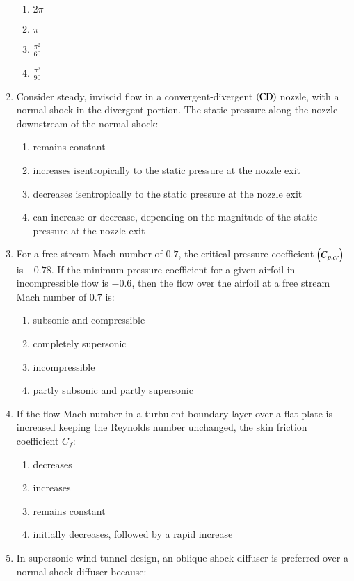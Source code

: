 \documentclass[journal]{IEEEtran}
\begin{document}
\begin{enumerate}[start=35]
\begin{enumerate}
    \item $2\pi$
    \item $\pi$
    \item $\frac{\pi^2}{60}$
    \item $\frac{\pi^2}{90}$
\end{enumerate}
\item Consider steady, inviscid flow in a convergent-divergent $\left(\text{CD}\right)$ nozzle, with a normal shock in the divergent portion. The static pressure along the nozzle downstream of the normal shock:
\begin{enumerate}
    \item remains constant
    \item increases isentropically to the static pressure at the nozzle exit
    \item decreases isentropically to the static pressure at the nozzle exit
    \item can increase or decrease, depending on the magnitude of the static pressure at the nozzle exit
\end{enumerate}
\item For a free stream Mach number of $0.7$, the critical pressure coefficient $\left(C_{p,cr}\right)$ is $-0.78$. If the minimum pressure coefficient for a given airfoil in incompressible flow is $-0.6$, then the flow over the airfoil at a free stream Mach number of $0.7$ is:
\begin{enumerate}
    \item subsonic and compressible
    \item completely supersonic
    \item incompressible
    \item partly subsonic and partly supersonic
\end{enumerate}
\item If the flow Mach number in a turbulent boundary layer over a flat plate is increased keeping the Reynolds number unchanged, the skin friction coefficient $C_f$:
\begin{enumerate}
    \item decreases
    \item increases
    \item remains constant
    \item initially decreases, followed by a rapid increase
\end{enumerate}
\item In supersonic wind-tunnel design, an oblique shock diffuser is preferred over a normal shock diffuser because:

\end{enumerate}
\end{document}
